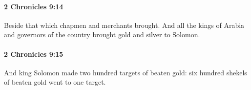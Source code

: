 		\paragraph{2 Chronicles 9:14} %
			\label{2CHRONICLES-9-14}

			Beside that which chapmen and merchants brought. And all the kings of Arabia and governors of the country brought gold and silver to Solomon.


		\paragraph{2 Chronicles 9:15} %
			\label{2CHRONICLES-9-15}

			And king Solomon made two hundred targets of beaten gold: six hundred shekels of beaten gold went to one target.



